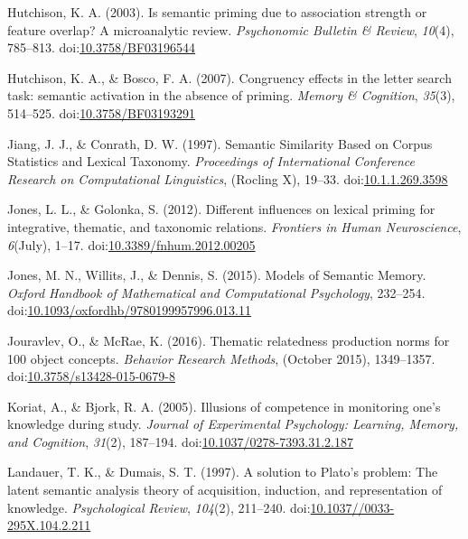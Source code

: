 \documentclass[english,man]{apa6}
\theoremstyle{definition}
\theoremstyle{definition}
\theoremstyle{definition}
\theoremstyle{remark}
\begin{document}
\hypertarget{ref-Hutchison2003}{}
Hutchison, K. A. (2003). Is semantic priming due to association strength
or feature overlap? A microanalytic review. \emph{Psychonomic Bulletin
\& Review}, \emph{10}(4), 785--813.
doi:\href{https://doi.org/10.3758/BF03196544}{10.3758/BF03196544}

\hypertarget{ref-Hutchison2007}{}
Hutchison, K. A., \& Bosco, F. A. (2007). Congruency effects in the
letter search task: semantic activation in the absence of priming.
\emph{Memory \& Cognition}, \emph{35}(3), 514--525.
doi:\href{https://doi.org/10.3758/BF03193291}{10.3758/BF03193291}

\hypertarget{ref-Jiang1997}{}
Jiang, J. J., \& Conrath, D. W. (1997). Semantic Similarity Based on
Corpus Statistics and Lexical Taxonomy. \emph{Proceedings of
International Conference Research on Computational Linguistics},
(Rocling X), 19--33.
doi:\href{https://doi.org/10.1.1.269.3598}{10.1.1.269.3598}

\hypertarget{ref-Jones2012}{}
Jones, L. L., \& Golonka, S. (2012). Different influences on lexical
priming for integrative, thematic, and taxonomic relations.
\emph{Frontiers in Human Neuroscience}, \emph{6}(July), 1--17.
doi:\href{https://doi.org/10.3389/fnhum.2012.00205}{10.3389/fnhum.2012.00205}

\hypertarget{ref-Jones2015}{}
Jones, M. N., Willits, J., \& Dennis, S. (2015). Models of Semantic
Memory. \emph{Oxford Handbook of Mathematical and Computational
Psychology}, 232--254.
doi:\href{https://doi.org/10.1093/oxfordhb/9780199957996.013.11}{10.1093/oxfordhb/9780199957996.013.11}

\hypertarget{ref-Jouravlev2016}{}
Jouravlev, O., \& McRae, K. (2016). Thematic relatedness production
norms for 100 object concepts. \emph{Behavior Research Methods},
(October 2015), 1349--1357.
doi:\href{https://doi.org/10.3758/s13428-015-0679-8}{10.3758/s13428-015-0679-8}

\hypertarget{ref-Koriat2005}{}
Koriat, A., \& Bjork, R. A. (2005). Illusions of competence in
monitoring one's knowledge during study. \emph{Journal of Experimental
Psychology: Learning, Memory, and Cognition}, \emph{31}(2), 187--194.
doi:\href{https://doi.org/10.1037/0278-7393.31.2.187}{10.1037/0278-7393.31.2.187}

\hypertarget{ref-Landauer1997}{}
Landauer, T. K., \& Dumais, S. T. (1997). A solution to Plato's problem:
The latent semantic analysis theory of acquisition, induction, and
representation of knowledge. \emph{Psychological Review}, \emph{104}(2),
211--240.
doi:\href{https://doi.org/10.1037//0033-295X.104.2.211}{10.1037//0033-295X.104.2.211}
\end{document}
